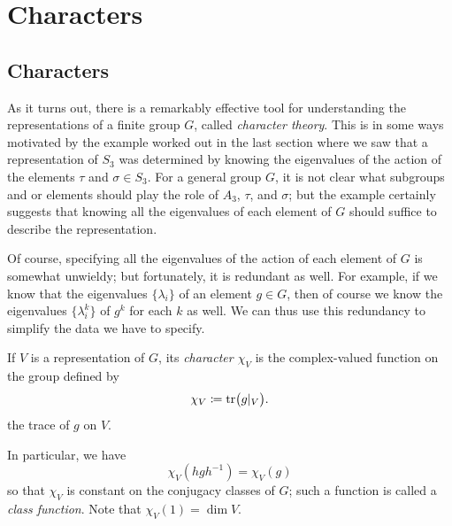 \section{Characters}
\subsection{Characters}
As it turns out, there is a remarkably effective tool for understanding the
representations of a finite group $G$, called \emph{character theory}. This
is in some ways motivated by the example worked out in the last section
where we saw that a representation of $S_3$ was determined by knowing the
eigenvalues of the action of the elements $\tau$ and $\sigma\in S_3$. For a
general group $G$, it is not clear what subgroups and or elements should
play the role of $A_3$, $\tau$, and $\sigma$; but the example certainly
suggests that knowing all the eigenvalues of each element of $G$ should
suffice to describe the representation.

Of course, specifying all the eigenvalues of the action of each element of
$G$ is somewhat unwieldy; but fortunately, it is redundant as well. For
example, if we know that the eigenvalues $\{\lambda_i\}$ of an element
$g\in G$, then of course we know the eigenvalues $\{\lambda_i^k\}$ of $g^k$
for each $k$ as well. We can thus use this redundancy to simplify the data
we have to specify.

\begin{definition}
If $V$ is a representation of $G$, its \emph{character $\chi_V$} is the
complex-valued function on the group defined by
\[
\chi_V\coloneqq\operatorname{tr}\bigr(g|_V\bigl).
\]
the trace of $g$ on $V$.
\end{definition}

In particular, we have
\[
\chi_V(hgh^{-1})=\chi_V(g)
\]
so that $\chi_V$ is constant on the conjugacy classes of $G$; such a
function is called a \emph{class function}. Note that $\chi_V(1)=\dim V$.

